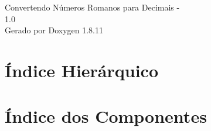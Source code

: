 \documentclass[twoside]{book}
\newcommand{\+}{\discretionary{\mbox{\scriptsize$\hookleftarrow$}}{}{}}
\newcommand{\clearemptydoublepage}{%
  \newpage{\pagestyle{empty}\cleardoublepage}%
}
\begin{document}
\hypersetup{pageanchor=false,
             bookmarksnumbered=true,
             pdfencoding=unicode
            }
\begin{titlepage}
\vspace*{7cm}
\begin{center}%
{\Large Convertendo Números Romanos para Decimais -\/ \\[1ex]\large 1.\+0 }\\
\vspace*{1cm}
{\large Gerado por Doxygen 1.8.11}\\
\end{center}
\end{titlepage}
\clearemptydoublepage
\tableofcontents
\clearemptydoublepage
{}
\hypersetup{pageanchor=true}

\chapter{Índice Hierárquico}

\chapter{Índice dos Componentes}

\end{document}
